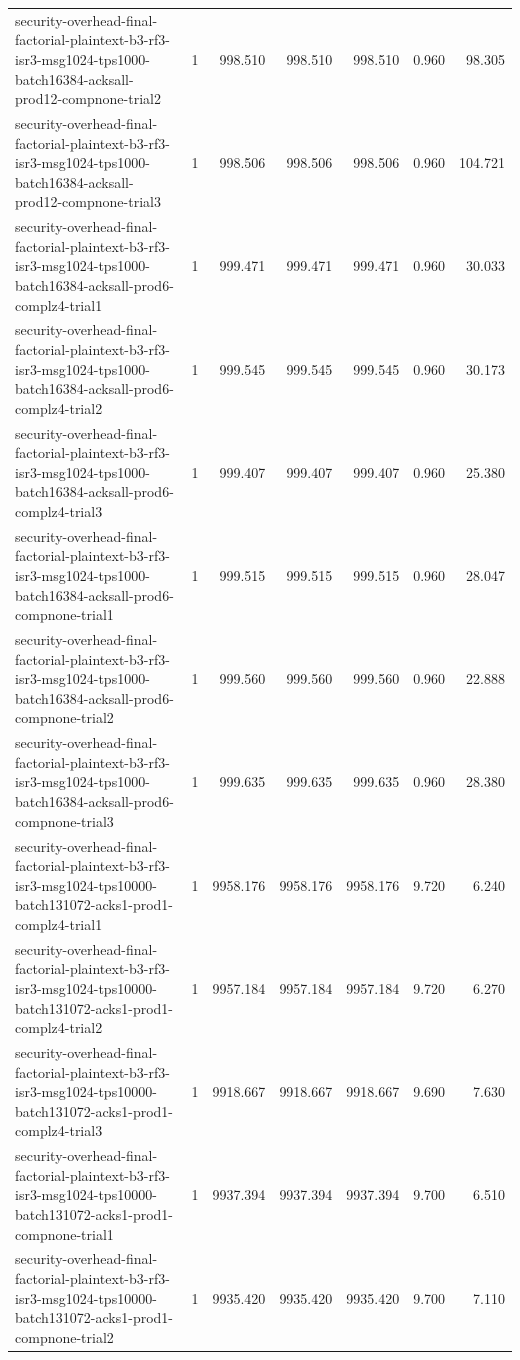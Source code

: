 \begin{tabular}{lrrrrrr}
security-overhead-final-factorial-plaintext-b3-rf3-isr3-msg1024-tps1000-batch16384-acksall-prod12-compnone-trial2 & 1 & 998.510 & 998.510 & 998.510 & 0.960 & 98.305 \\
security-overhead-final-factorial-plaintext-b3-rf3-isr3-msg1024-tps1000-batch16384-acksall-prod12-compnone-trial3 & 1 & 998.506 & 998.506 & 998.506 & 0.960 & 104.721 \\
security-overhead-final-factorial-plaintext-b3-rf3-isr3-msg1024-tps1000-batch16384-acksall-prod6-complz4-trial1 & 1 & 999.471 & 999.471 & 999.471 & 0.960 & 30.033 \\
security-overhead-final-factorial-plaintext-b3-rf3-isr3-msg1024-tps1000-batch16384-acksall-prod6-complz4-trial2 & 1 & 999.545 & 999.545 & 999.545 & 0.960 & 30.173 \\
security-overhead-final-factorial-plaintext-b3-rf3-isr3-msg1024-tps1000-batch16384-acksall-prod6-complz4-trial3 & 1 & 999.407 & 999.407 & 999.407 & 0.960 & 25.380 \\
security-overhead-final-factorial-plaintext-b3-rf3-isr3-msg1024-tps1000-batch16384-acksall-prod6-compnone-trial1 & 1 & 999.515 & 999.515 & 999.515 & 0.960 & 28.047 \\
security-overhead-final-factorial-plaintext-b3-rf3-isr3-msg1024-tps1000-batch16384-acksall-prod6-compnone-trial2 & 1 & 999.560 & 999.560 & 999.560 & 0.960 & 22.888 \\
security-overhead-final-factorial-plaintext-b3-rf3-isr3-msg1024-tps1000-batch16384-acksall-prod6-compnone-trial3 & 1 & 999.635 & 999.635 & 999.635 & 0.960 & 28.380 \\
security-overhead-final-factorial-plaintext-b3-rf3-isr3-msg1024-tps10000-batch131072-acks1-prod1-complz4-trial1 & 1 & 9958.176 & 9958.176 & 9958.176 & 9.720 & 6.240 \\
security-overhead-final-factorial-plaintext-b3-rf3-isr3-msg1024-tps10000-batch131072-acks1-prod1-complz4-trial2 & 1 & 9957.184 & 9957.184 & 9957.184 & 9.720 & 6.270 \\
security-overhead-final-factorial-plaintext-b3-rf3-isr3-msg1024-tps10000-batch131072-acks1-prod1-complz4-trial3 & 1 & 9918.667 & 9918.667 & 9918.667 & 9.690 & 7.630 \\
security-overhead-final-factorial-plaintext-b3-rf3-isr3-msg1024-tps10000-batch131072-acks1-prod1-compnone-trial1 & 1 & 9937.394 & 9937.394 & 9937.394 & 9.700 & 6.510 \\
security-overhead-final-factorial-plaintext-b3-rf3-isr3-msg1024-tps10000-batch131072-acks1-prod1-compnone-trial2 & 1 & 9935.420 & 9935.420 & 9935.420 & 9.700 & 7.110 \\

\end{tabular}
